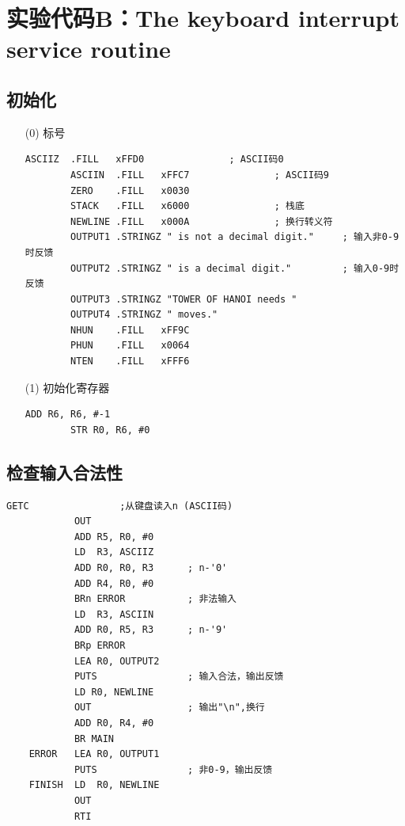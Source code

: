 \documentclass[UTF8]{ctexart}
\begin{document}
\section{实验代码B：The keyboard interrupt service routine}
\subsection{初始化}
\begin{enumerate}
    \item [(0)]标号
    \begin{lstlisting}[basicstyle=\ttfamily,language={[x86masm]Assembler}]
        ASCIIZ  .FILL   xFFD0               ; ASCII码0
        ASCIIN  .FILL   xFFC7               ; ASCII码9
        ZERO    .FILL   x0030               
        STACK   .FILL   x6000               ; 栈底
        NEWLINE .FILL   x000A               ; 换行转义符
        OUTPUT1 .STRINGZ " is not a decimal digit."     ; 输入非0-9时反馈
        OUTPUT2 .STRINGZ " is a decimal digit."         ; 输入0-9时反馈
        OUTPUT3 .STRINGZ "TOWER OF HANOI needs "
        OUTPUT4 .STRINGZ " moves."
        NHUN    .FILL   xFF9C
        PHUN    .FILL   x0064
        NTEN    .FILL   xFFF6
    \end{lstlisting}

    \item [(1)]初始化寄存器
    \begin{lstlisting}[basicstyle=\ttfamily,language={[x86masm]Assembler}]
        ADD R6, R6, #-1
        STR R0, R6, #0
    \end{lstlisting}
\end{enumerate}

\subsection{检查输入合法性}
    \begin{lstlisting}[basicstyle=\ttfamily,language={[x86masm]Assembler}]
            GETC                ;从键盘读入n (ASCII码)
            OUT
            ADD R5, R0, #0
            LD  R3, ASCIIZ
            ADD R0, R0, R3      ; n-'0'
            ADD R4, R0, #0      
            BRn ERROR           ; 非法输入
            LD  R3, ASCIIN     
            ADD R0, R5, R3      ; n-'9'
            BRp ERROR
            LEA R0, OUTPUT2 
            PUTS                ; 输入合法，输出反馈
            LD R0, NEWLINE
            OUT                 ; 输出"\n",换行
            ADD R0, R4, #0
            BR MAIN
    ERROR   LEA R0, OUTPUT1
            PUTS                ; 非0-9，输出反馈
    FINISH  LD  R0, NEWLINE
            OUT
            RTI
    \end{lstlisting}
\end{document}
